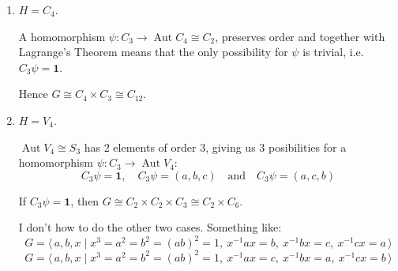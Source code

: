\documentclass[a4paper, oneside, 12pt, final]{article}
\theoremstyle{definition}
\DeclareMathOperator{\Aut}{Aut}
\begin{document}
\begin{enumerate}
    \item \(H = C_4\).

        A homomorphism \(\psi:C_3 \to \Aut{C_4} \cong C_2\), preserves order
        and together with Lagrange's Theorem means that the only possibility
        for \(\psi\) is trivial, i.e. \(C_3\psi = \bm{1}\).

        Hence \(G \cong C_4 \times C_3 \cong C_{12}\).

    \item \(H = V_4\).

        \(\Aut{V_4} \cong S_3\) has 2 elements of order 3, giving us 3
        posibilities for a homomorphism \(\psi:C_3 \to \Aut{V_4}\):
        \[C_3\psi = \bm{1}, \quad C_3\psi = (a, b, c) \quad \text{and} \quad
        C_3\psi = (a, c, b)\]

        If \(C_3\psi = \bm{1}\), then \(G \cong C_2 \times C_2 \times C_3 \cong
        C_2 \times C_6\).

        I don't how to do the other two cases. Something like:
        \[G = \langle\, a, b, x \mid x^3 = a^2 = b^2 = (ab)^2 = 1,\ x^{-1}ax =
        b,\ x^{-1}bx = c,\ x^{-1}cx = a\, \rangle\]
        \[G = \langle\, a, b, x \mid x^3 = a^2 = b^2 = (ab)^2 = 1,\ x^{-1}ax =
        c,\ x^{-1}bx = a,\ x^{-1}cx = b\, \rangle\]
\end{enumerate}
\end{document}
